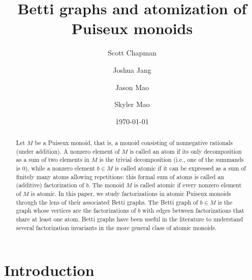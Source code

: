\documentclass[12pt]{amsart}
\theoremstyle{definition}
\numberwithin{equation}{section}
\begin{document}
	
	\mbox{}
	\title{Betti graphs and atomization of Puiseux monoids}
	
	\author{Scott Chapman}
	\address{Department of Mathematics and Statistics\\Sam Houston State University\\Huntsville, TX 77341}
	
	\author{Joshua Jang}
	\address{Oxford Academy\\Cypress, CA 90630}

	\author{Jason Mao}
	\address{Morris Hills School\\Rockaway, NJ 07866}

	\author{Skyler Mao}
	\address{Saratoga School\\Saratoga, CA 95070}

	
\date{\today}

\begin{abstract}
	 Let $M$ be a Puiseux monoid, that is, a monoid consisting of nonnegative rationals (under addition). A nonzero element of $M$ is called an atom if its only decomposition as a sum of two elements in $M$ is the trivial decomposition (i.e., one of the summands is $0$), while a nonzero element $b \in M$ is called atomic if it can be expressed as a sum of finitely many atoms allowing repetitions: this formal sum of atoms is called an (additive) factorization of $b$. The monoid $M$ is called atomic if every nonzero element of $M$ is atomic. In this paper, we study factorizations in atomic Puiseux monoids through the lens of their associated Betti graphs. The Betti graph of $b \in M$ is the graph whose vertices are the factorizations of $b$ with edges between factorizations that share at least one atom. Betti graphs have been useful in the literature to understand several factorization invariants in the more general class of atomic monoids. %
\end{abstract}
\medskip

\maketitle





\bigskip
\section{Introduction}
\label{sec:intro}
\end{document}

